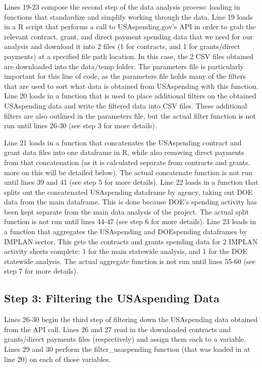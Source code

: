 \documentclass[
]{book}
\begin{document}
Lines 19-23 compose the second step of the data analysis process: loading in functions that standardize and simplify working through the data. Line 19 loads in a R script that performs a call to USAspending.gov's API in order to grab the relevant contract, grant, and direct payment spending data that we need for our analysis and download it into 2 files (1 for contracts, and 1 for grants/direct payments) at a specified file path location. In this case, the 2 CSV files obtained are downloaded into the data/temp folder. The parameters file is particularly important for this line of code, as the parameters file holds many of the filters that are used to sort what data is obtained from USAspending with this function. Line 20 loads in a function that is used to place additional filters on the obtained USAspending data and write the filtered data into CSV files. These additional filters are also outlined in the parameters file, but the actual filter function is not run until lines 26-30 (see step 3 for more details).

Line 21 loads in a function that concatenates the USAspending contract and grant data files into one dataframe in R, while also removing direct payments from that concatenation (as it is calculated separate from contracts and grants. more on this will be detailed below). The actual concatenate function is not run until lines 39 and 41 (see step 5 for more details). Line 22 loads in a function that splits out the concatenated USAspending dataframe by agency, taking out DOE data from the main dataframe. This is done because DOE's spending activity has been kept separate from the main data analysis of the project. The actual split function is not run until lines 44-47 (see step 6 for more details). Line 23 loads in a function that aggregates the USAspending and DOEspending dataframes by IMPLAN sector. This gets the contracts and grants spending data for 2 IMPLAN activity sheets complete: 1 for the main statewide analysis, and 1 for the DOE statewide analysis. The actual aggregate function is not run until lines 55-60 (see step 7 for more details).

\hypertarget{step-3-filtering-the-usaspending-data}{%
\subsection{Step 3: Filtering the USAspending Data}\label{step-3-filtering-the-usaspending-data}}

Lines 26-30 begin the third step of filtering down the USAspending data obtained from the API call. Lines 26 and 27 read in the downloaded contracts and grants/direct payments files (respectively) and assign them each to a variable. Lines 29 and 30 perform the filter\_usaspending function (that was loaded in at line 20) on each of those variables.
\end{document}
